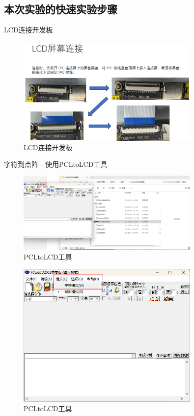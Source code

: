 \documentclass[UTF8]{article}
\theoremstyle{MyLineTheoremStyle} %
\theoremstyle{MyBlockTheoremStyle} %
\theoremstyle{MySubsubsectionStyle} %
\begin{document}
\cleardoublepage

\subsection{本次实验的快速实验步骤}

LCD连接开发板
\begin{figure}[H]
    \centering
    \includegraphics[width=0.8\textwidth]{LCD_connection.png}
    \caption{LCD连接开发板}
    \label{fig:LCD连接开发板}
\end{figure}

字符到点阵—使用PCLtoLCD工具
\begin{figure}[H]
    \centering
    \includegraphics[width=0.8\textwidth]{PCLtoLCD1.png}
    \caption{PCLtoLCD工具}
    \label{fig:PCLtoLCD工具}
\end{figure}

\begin{figure}
    \centering
    \includegraphics[width=0.8\textwidth]{PCLtoLCD2.png}
    \caption{PCLtoLCD工具}
    \label{fig:PCLtoLCD工具2}
\end{figure}
\end{document}
